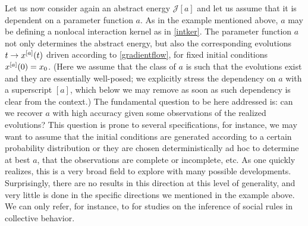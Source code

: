 Let us now consider again an abstract energy $\mathcal J[a]$ and let us assume that it is dependent on a parameter function $a$. As in the example mentioned above, $a$ may be defining a nonlocal interaction kernel as in  \eqref{intker}. The parameter function $a$ not only determines the abstract energy, but also the corresponding evolutions  $t \to x^{[a]}(t)$ driven according to \eqref{gradientflow}, for fixed initial conditions $x^{[a]}(0)=x_0$. (Here we assume that the class of $a$ is such that the evolutions exist and they are essentially well-posed; we explicitly stress the dependency on $a$ with a superscript $[a]$, which below we may remove as soon as such dependency is clear from the context.)
The fundamental question to be here addressed is: can we recover $a$ with high accuracy given some observations of the realized evolutions? This question is prone to several specifications, for instance, we may want to assume that the initial conditions are generated according to a certain probability distribution or they are chosen deterministically ad hoc to determine at best $a$, that the observations are complete or incomplete, etc. As one  quickly realizes, this is a very broad field to explore with many possible developments. Surprisingly, there are no results in this direction at this level of generality, and very little is done in the specific directions we mentioned in the example above. We can only refer, for instance,  to \cite{mann11,heoemascszwa11} for studies on the inference of social rules in collective behavior. 
